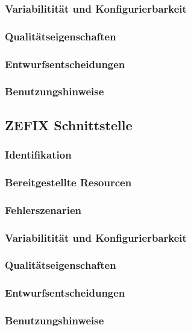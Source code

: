 \subsubsection{Variabilitität und Konfigurierbarkeit}

\subsubsection{Qualitätseigenschaften}

\subsubsection{Entwurfsentscheidungen} 

\subsubsection{Benutzungshinweise} 


\subsection{ZEFIX Schnittstelle}

\subsubsection{Identifikation}

\subsubsection{Bereitgestellte Resourcen}

\subsubsection{Fehlerszenarien}

\subsubsection{Variabilitität und Konfigurierbarkeit}

\subsubsection{Qualitätseigenschaften}

\subsubsection{Entwurfsentscheidungen} 

\subsubsection{Benutzungshinweise} 



